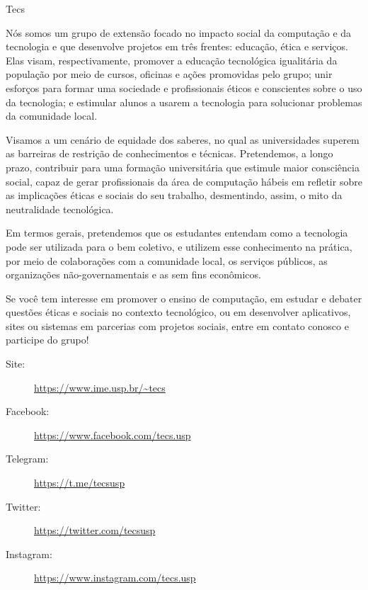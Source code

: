 
\begin{subsecao}{Tecs}


Nós somos um grupo de extensão focado no impacto social da computação e da 
tecnologia e que desenvolve projetos em três frentes: educação, ética e 
serviços. Elas visam, respectivamente, promover a educação tecnológica 
igualitária da população por meio de cursos, oficinas e ações promovidas pelo 
grupo; unir esforços para formar uma sociedade e profissionais éticos e
conscientes sobre o uso da tecnologia; e estimular alunos a usarem a tecnologia 
para solucionar problemas da comunidade local.

Visamos a um cenário de equidade dos saberes, no qual as universidades superem
as barreiras de restrição de conhecimentos e técnicas. Pretendemos, a longo prazo,
contribuir para uma formação universitária que estimule maior consciência social, 
capaz de gerar profissionais da área de computação hábeis em refletir sobre as 
implicações éticas e sociais do seu trabalho, desmentindo, assim, o mito da 
neutralidade tecnológica. 

Em termos gerais, pretendemos que os estudantes entendam como a tecnologia pode
ser utilizada para o bem coletivo, e utilizem esse conhecimento na prática, por
meio de colaborações com a comunidade local, os serviços públicos, as
organizações não-governamentais e as sem fins econômicos.

Se você tem interesse em promover o ensino de computação, em estudar e debater 
questões éticas e sociais no contexto tecnológico, ou em desenvolver aplicativos,
sites ou sistemas em parcerias com projetos sociais, entre em contato conosco e 
participe do grupo! 

\vspace{-1em}
\begin{description}
  \item[Site:] \url{https://www.ime.usp.br/~tecs}
  \item[Facebook:] \url{https://www.facebook.com/tecs.usp}
  \item[Telegram:] \url{https://t.me/tecsusp}
  \item[Twitter:] \url{https://twitter.com/tecsusp}
  \item[Instagram:] \url{https://www.instagram.com/tecs.usp} 
\end{description}

\end{subsecao}
